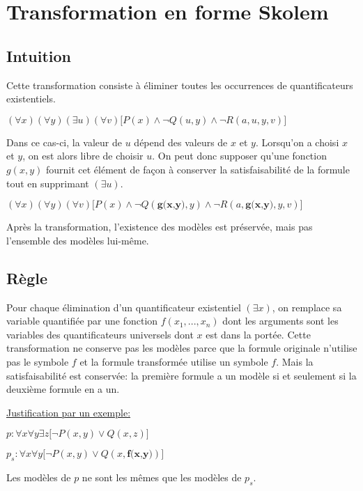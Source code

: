 {%

\section{Transformation en forme Skolem}
\subsection{Intuition}

Cette transformation consiste à éliminer toutes les occurrences de quantificateurs existentiels.
\smallskip

$(\forall x)(\forall y)(\exists u)(\forall v) \big[ P(x) \wedge \neg Q(u,y) \wedge \neg R(a,u,y,v) \big]$
\smallskip 


Dans ce cas-ci, la valeur de $u$ dépend des valeurs de $x$ et $y$. Lorsqu'on a choisi $x$ et $y$, on est alors libre de choisir $u$.
On peut donc supposer qu'une fonction $g(x,y)$ fournit cet élément de façon à conserver la satisfaisabilité de la formule tout en supprimant $(\exists u)$.
\smallskip

$(\forall x)(\forall y)(\forall v) \big[ P(x) \wedge \neg Q(\textbf{g(x,y)},y) \wedge \neg R(a,\textbf{g(x,y)},y,v) \big]$
\smallskip

Après la transformation, l'existence des modèles est préservée, mais pas l'ensemble des modèles lui-même.

\subsection{Règle}

Pour chaque élimination d'un quantificateur existentiel $(\exists x)$, on remplace sa variable quantifiée par une fonction $f(x_1,...,x_n)$ dont les arguments sont les variables des quantificateurs universels dont $x$ est dans la portée.
Cette transformation ne conserve pas les modèles parce que la formule originale n'utilise pas le symbole $f$
et la formule transformée utilise un symbole $f$.
Mais la satisfaisabilité est conservée: la première formule a un modèle si et seulement si la deuxième formule en a un.
\smallskip

\underline{Justification par un exemple:}

$p: \forall x \forall y \exists z \big[ \neg P(x,y) \vee Q(x,z) \big]$
\smallskip

$p_s: \forall x \forall y \big[ \neg P(x,y) \vee Q(x,\textbf{f(x,y)}) \big]$
\smallskip

Les modèles de $p$ ne sont les mêmes que les modèles de $p_s$.

}
